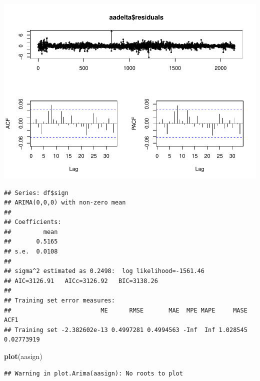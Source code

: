 \documentclass[11pt, a4paper]{report}
\newenvironment{Shaded}{\begin{snugshade}}{\end{snugshade}}
\newcommand{\DataTypeTok}[1]{\textcolor[rgb]{0.13,0.29,0.53}{#1}}
\newcommand{\KeywordTok}[1]{\textcolor[rgb]{0.13,0.29,0.53}{\textbf{#1}}}
\newcommand{\NormalTok}[1]{#1}
\newcommand{\OperatorTok}[1]{\textcolor[rgb]{0.81,0.36,0.00}{\textbf{#1}}}
\newcommand{\StringTok}[1]{\textcolor[rgb]{0.31,0.60,0.02}{#1}}
\theoremstyle{plain}
\theoremstyle{plain}
\theoremstyle{remark}
\begin{document}
\begin{center}\includegraphics{Econo2_P1_files/figure-latex/auto arima-2} \end{center}

\begin{Shaded}
\end{Shaded}

\begin{verbatim}
## Series: df$sign 
## ARIMA(0,0,0) with non-zero mean 
## 
## Coefficients:
##         mean
##       0.5165
## s.e.  0.0108
## 
## sigma^2 estimated as 0.2498:  log likelihood=-1561.46
## AIC=3126.91   AICc=3126.92   BIC=3138.26
## 
## Training set error measures:
##                         ME      RMSE       MAE  MPE MAPE     MASE       ACF1
## Training set -2.382602e-13 0.4997281 0.4994563 -Inf  Inf 1.028545 0.02773919
\end{verbatim}

\begin{Shaded}
\begin{Highlighting}[]
\KeywordTok{plot}\NormalTok{(aasign)}
\end{Highlighting}
\end{Shaded}

\begin{verbatim}
## Warning in plot.Arima(aasign): No roots to plot
\end{verbatim}
\end{document}
